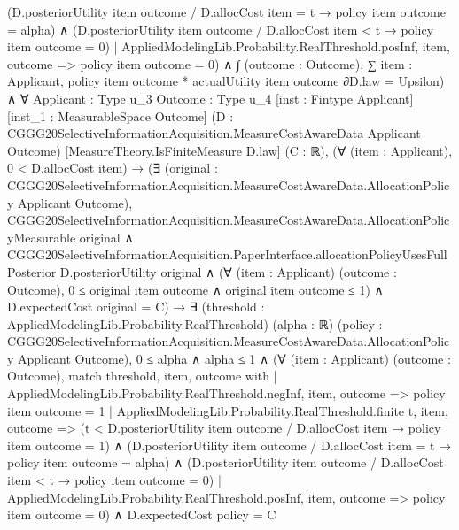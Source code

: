\documentclass[10pt]{article}
\begin{document}
\begin{ReviewVerbatim}
                            (D.posteriorUtility item outcome / D.allocCost item = t → policy item outcome = alpha) ∧
                              (D.posteriorUtility item outcome / D.allocCost item < t → policy item outcome = 0)
                        | AppliedModelingLib.Probability.RealThreshold.posInf, item, outcome =>
                          policy item outcome = 0) ∧
                      ∫ (outcome : Outcome),
                          ∑ item : Applicant, policy item outcome * actualUtility item outcome ∂D.law =
                        Upsilon) ∧
  ∀ {Applicant : Type u_3} {Outcome : Type u_4} [inst : Fintype Applicant] [inst_1 : MeasurableSpace Outcome]
    (D : CGGG20SelectiveInformationAcquisition.MeasureCostAwareData Applicant Outcome)
    [MeasureTheory.IsFiniteMeasure D.law] (C : ℝ),
    (∀ (item : Applicant), 0 < D.allocCost item) →
      (∃ (original : CGGG20SelectiveInformationAcquisition.MeasureCostAwareData.AllocationPolicy Applicant Outcome),
          CGGG20SelectiveInformationAcquisition.MeasureCostAwareData.AllocationPolicyMeasurable original ∧
            CGGG20SelectiveInformationAcquisition.PaperInterface.allocationPolicyUsesFullPosterior D.posteriorUtility
                original ∧
              (∀ (item : Applicant) (outcome : Outcome), 0 ≤ original item outcome ∧ original item outcome ≤ 1) ∧
                D.expectedCost original = C) →
        ∃ (threshold : AppliedModelingLib.Probability.RealThreshold) (alpha : ℝ) (policy :
          CGGG20SelectiveInformationAcquisition.MeasureCostAwareData.AllocationPolicy Applicant Outcome),
          0 ≤ alpha ∧
            alpha ≤ 1 ∧
              (∀ (item : Applicant) (outcome : Outcome),
                  match threshold, item, outcome with
                  | AppliedModelingLib.Probability.RealThreshold.negInf, item, outcome => policy item outcome = 1
                  | AppliedModelingLib.Probability.RealThreshold.finite t, item, outcome =>
                    (t < D.posteriorUtility item outcome / D.allocCost item → policy item outcome = 1) ∧
                      (D.posteriorUtility item outcome / D.allocCost item = t → policy item outcome = alpha) ∧
                        (D.posteriorUtility item outcome / D.allocCost item < t → policy item outcome = 0)
                  | AppliedModelingLib.Probability.RealThreshold.posInf, item, outcome => policy item outcome = 0) ∧
                D.expectedCost policy = C
\end{ReviewVerbatim}
\end{document}
